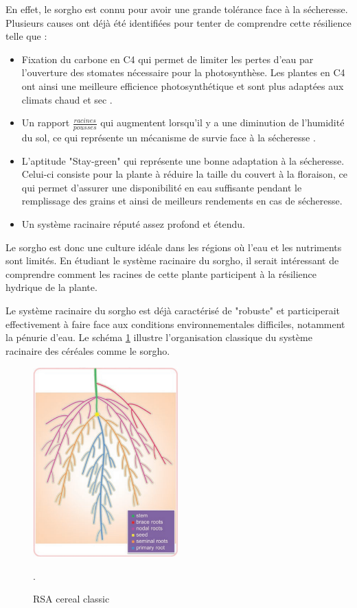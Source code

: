 En effet, le sorgho est connu pour avoir une grande tolérance face à la sécheresse. Plusieurs causes ont déjà été identifiées pour tenter de comprendre cette résilience telle que :
\begin{itemize}
    \item Fixation du carbone en C4 qui permet de limiter les pertes d'eau par l'ouverture des stomates nécessaire pour la photosynthèse. Les plantes en C4 ont ainsi une meilleure efficience photosynthétique et sont plus adaptées aux climats chaud et sec \citep{shanker_c4_2011}.
    \item Un rapport $\frac{racines}{pousses}$ qui augmentent lorsqu'il y a une diminution de l'humidité du sol, ce qui représente un mécanisme de survie face à la sécheresse \citep{mwamahonje_drought_2021}.
    \item L'aptitude "Stay-green" qui représente une bonne adaptation à la sécheresse.
    Celui-ci consiste pour la plante à réduire la taille du couvert à la floraison, ce qui permet d'assurer une disponibilité en eau suffisante pendant le remplissage des grains et ainsi de meilleurs rendements en cas de sécheresse.
    \item Un système racinaire réputé assez profond et étendu.
\end{itemize}
Le sorgho est donc une culture idéale dans les régions où l'eau et les nutriments sont limités. 
En étudiant le système racinaire du sorgho, il serait intéressant de comprendre comment les racines de cette plante participent à la résilience hydrique de la plante.
\newline

Le système racinaire du sorgho est déjà caractérisé de "robuste" et participerait effectivement à faire face aux conditions environnementales difficiles, notamment la pénurie d'eau.
Le schéma \ref{fig:RSA} illustre l'organisation classique du système racinaire des céréales comme le sorgho.
\newpage

\begin{figure}[ht]
\centering
\includegraphics[width=0.5\textwidth]{Image/RSA.png}
\caption{RSA cereal classic \citep{correa_soil_2019}}.
\label{fig:RSA}
\end{figure}

